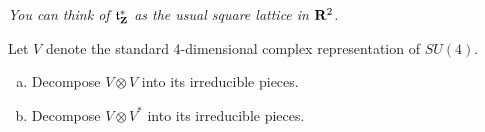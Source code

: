 \documentclass[12pt]{article}
\begin{document}
\begin{question}
{\em You can think of $\mathfrak{t}^*_{\mathbf{Z}}$ as the usual square lattice in $\mathbf{R}^2$.}
\end{question}

\iffalse
\begin{answer}
The Lie algebra is 10 complex dimensional.

We have
\begin{align*}
[H_i,K_j^{\pm}]&=\pm \delta_{ij}K_j^{\pm}\\
[H_1,L^{\pm}]&=\pm L^{\pm}\\
[H_2,L^{\pm}]&=\pm L^{\pm}\\
[H_1,M^{\pm}]&=\pm M^{\pm}\\
[H_2,M^{\pm}]&=\mp M^{\pm}
\end{align*}
so the weights are $\pm L_i$ (with weight vectors $K_i^{\pm}$), $\pm (L_1+L_2)$ (with weight vectors $L^{\pm}$) and $\pm (L_1-L_2)$ (with weight vectors $M^{\pm}$). The root diagram is the set of points
\[\{\pm(1,1),\pm(1,-1),(\pm 1,0),(0,\pm 1),0\}\]
where all root spaces have multiplicity 1 except the zero root space, which has multiplicity 2.
\end{answer}
\newpage
\fi

\bigskip

\begin{question}
Let $V$ denote the standard 4-dimensional complex representation of $SU(4)$.
\begin{enumerate}[(a)]
\item Decompose $V\otimes V$ into its irreducible pieces.
\item Decompose $V\otimes V^*$ into its irreducible pieces.
\end{enumerate}
\end{question}

\iffalse
\begin{answer}
\begin{enumerate}
\item There is a tetrahedral weight diagram with ten vertices (all multiplicity 1), namely the symmetric square, and an octahedral diagram with its six corners (all multiplicity 1), namely the exterior square. These are the weight diagrams of the irreducible pieces.
\item This splits as the adjoint representation plus the trivial one-dimensional representation.
\end{enumerate}
\end{answer}
\newpage
\fi



\iffalse

\fi
\end{document}
